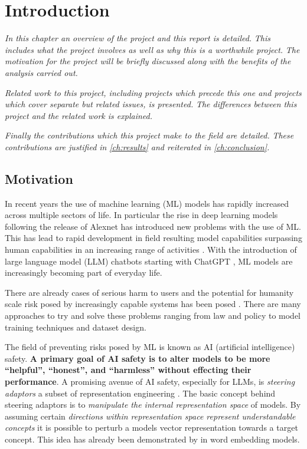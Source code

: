 \chapter{Introduction}
\label{ch:introduction}

\emph{In this chapter an overview of the project and this report is detailed.}
\emph{This includes what the project involves as well as why this is a worthwhile project.}
\emph{The motivation for the project will be briefly discussed along with the benefits of the analysis carried out.}

\emph{Related work to this project, including projects which precede this one and projects which cover separate but related issues, is presented.}
\emph{The differences between this project and the related work is explained.}

\emph{Finally the contributions which this project make to the field are detailed.}
\emph{These contributions are justified in \cref{ch:results} and reiterated in \cref{ch:conclusion}.}

\section{Motivation}

In recent years the use of machine learning (ML) models has rapidly increased across multiple sectors of life.
In particular the rise in deep learning models following the release of Alexnet \citep{alexnet} has introduced new problems with the use of ML.
This has lead to rapid development in field resulting  model capabilities surpassing human capabilities in an increasing range of activities \citep{dynabench, gpt-5, grok-4, hle}.
With the introduction of large language model (LLM) chatbots starting with ChatGPT \citep{chatgpt}, ML models are increasingly becoming part of everyday life.

There are already cases of serious harm to users \citep{c.ai, psychosis} and the potential for humanity scale risk posed by increasingly capable systems has been posed \citep{survellience, deepfakes, disempowerment}.
There are many approaches to try and solve these problems ranging from law and policy to model training techniques and dataset design.

The field of preventing risks posed by ML is known as AI (artificial intelligence) safety.
\textbf{A primary goal of AI safety is to alter models to be more ``helpful'', ``honest'', and ``harmless'' without effecting their performance}.
A promising avenue of AI safety, especially for LLMs, is \emph{steering adaptors} a subset of representation engineering \citep{steering-taxonomy}.
The basic concept behind steering adaptors is to \emph{manipulate the internal representation space} of models.
By assuming certain \emph{directions within representation space represent understandable concepts} it is possible to perturb a models vector representation towards a target concept.
This idea has already been demonstrated by \citet{word2vec} in word embedding models.

